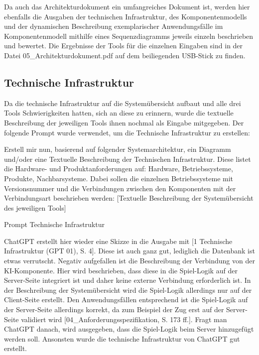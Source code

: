 Da auch das Architekturdokument ein umfangreiches Dokument ist, werden hier ebenfalls die Ausgaben der technischen Infrastruktur, des 
Komponentenmodells und der dynamischen Beschreibung exemplarischer Anwendungsfälle im Komponentenmodell mithilfe eines Sequenzdiagramms 
jeweils einzeln beschrieben und bewertet. Die Ergebnisse der Tools für die einzelnen Eingaben sind in der Datei 05\_Architekturdokument.pdf 
auf dem beiliegenden USB-Stick zu finden.

\subsection*{Technische Infrastruktur}

Da die technische Infrastruktur auf die Systemübersicht aufbaut und alle drei Tools Schwierigkeiten hatten, sich an diese zu erinnern, wurde 
die textuelle Beschreibung der jeweiligen Tools ihnen nochmal als Eingabe mitgegeben. Der folgende Prompt wurde verwendet, um die Technische 
Infrastruktur zu erstellen:

\begin{prompt}[H]
    \begin{tcolorbox}[colback=gray!20, colframe=gray!20, boxrule=0pt, sharp corners] 
        Erstell mir nun, basierend auf folgender Systemarchitektur, ein Diagramm und/oder eine Textuelle Beschreibung der Technischen Infrastruktur. 
        Diese listet die Hardware- und Produktanforderungen auf: Hardware, Betriebssysteme, Produkte, Nachbarsysteme. Dabei sollen die einzelnen 
        Betriebssysteme mit Versionsnummer und die Verbindungen zwischen den Komponenten mit der Verbindungsart beschrieben werden: [Textuelle 
        Beschreibung der Systemübersicht des jeweiligen Tools]
        \vfill
    \end{tcolorbox}
    \caption{Prompt Technische Infrastruktur}
    \label{Prompt Technische Infrastruktur}
\end{prompt}

ChatGPT erstellt hier wieder eine Skizze in die Ausgabe mit [1 Technische Infrastruktur (GPT 01), S. 4]. Diese ist auch ganz gut, lediglich die Datenbank ist etwas verrutscht. Negativ aufgefallen 
ist die Beschreibung der Verbindung von der KI-Komponente. Hier wird beschrieben, dass diese in die Spiel-Logik auf der Server-Seite integriert ist und 
daher keine externe Verbindung erforderlich ist. In der Beschreibung der Systemübersicht wird die Spiel-Logik allerdings nur auf der Client-Seite erstellt. 
Den Anwendungsfällen entsprechend ist die Spiel-Logik auf der Server-Seite allerdings korrekt, da zum Beispiel der Zug erst auf der Server-Seite validiert 
wird [04\_Anforderungsspezifikation, S. 173 ff.]. Fragt man ChatGPT danach, wird ausgegeben, dass die Spiel-Logik beim Server hinzugefügt werden soll. Ansonsten wurde die 
technische Infrastruktur von ChatGPT gut erstellt.

